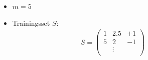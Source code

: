 \begin{frame}
    \begin{figure}[h]
        \begin{minipage}{0.4\textwidth} 
            \begin{figure}[h]
            \end{figure}
        \end{minipage}
        \hfill
        \begin{minipage}{0.4\textwidth}
            \begin{itemize}
                \item<2-> $m = 5$
                \item<2-> Trainingsset $S$:
                    \begin{align*}
                        S = \left( \begin{matrix}
                            1 & 2.5 & +1 \\
                            5 & 2 & -1 \\
                            & \vdots & \\
                        \end{matrix} \right) \\
                    \end{align*}
            \end{itemize} 
        \end{minipage}
    \end{figure}
\end{frame}

